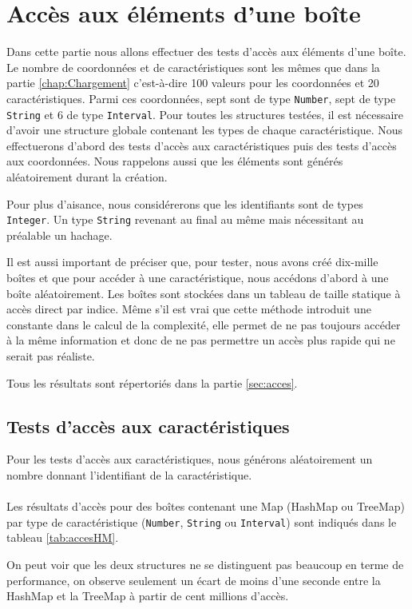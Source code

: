 \section{Accès aux éléments d'une boîte}
Dans cette partie nous allons effectuer des tests d'accès aux éléments d'une boîte. Le nombre de coordonnées et de caractéristiques sont les mêmes que dans la partie \ref{chap:Chargement} c'est-à-dire 100 valeurs pour les coordonnées et 20 caractéristiques. Parmi ces coordonnées, sept sont de type \verb+Number+, sept de type \verb+String+ et 6 de type \verb+Interval+. Pour toutes les structures testées, il est nécessaire d'avoir une structure globale contenant les types de chaque caractéristique. Nous effectuerons d'abord des tests d'accès aux caractéristiques puis des tests d'accès aux coordonnées. Nous rappelons aussi que les éléments sont générés aléatoirement durant la création.

Pour plus d'aisance, nous considérerons que les identifiants sont de types \verb+Integer+. Un type \verb+String+ revenant au final au même mais nécessitant au préalable un hachage.

Il est aussi important de préciser que, pour tester, nous avons créé dix-mille boîtes et que pour accéder à une caractéristique, nous accédons d'abord à une boîte aléatoirement. Les boîtes sont stockées dans un tableau de taille statique à accès direct par indice. Même s'il est vrai que cette méthode introduit une constante dans le calcul de la complexité, elle permet de ne pas toujours accéder à la même information et donc de ne pas permettre un accès plus rapide qui ne serait pas réaliste.

Tous les résultats sont répertoriés dans la partie \ref{sec:acces}.

\subsection{Tests d'accès aux caractéristiques}
Pour les tests d'accès aux caractéristiques, nous générons aléatoirement un nombre donnant l'identifiant de la caractéristique.

\paragraph{} Les résultats d'accès pour des boîtes contenant une Map (HashMap ou TreeMap) par type de caractéristique (\verb+Number+, \verb+String+ ou \verb+Interval+) sont indiqués dans le tableau \ref{tab:accesHM}.

On peut voir que les deux structures ne se distinguent pas beaucoup en terme de performance, on observe seulement un écart de moins d'une seconde entre la HashMap et la TreeMap à partir de cent millions d'accès.


